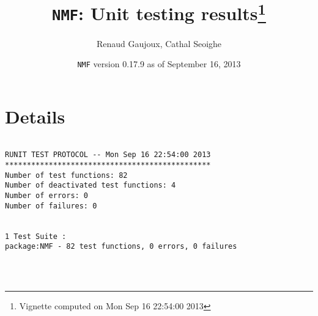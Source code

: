\documentclass[10pt]{article}\usepackage[]{graphicx}\usepackage[]{color}
\author{Renaud Gaujoux, Cathal Seoighe}
\title{\texttt{NMF}: Unit testing results\footnote{Vignette computed  on Mon Sep 16 22:54:00 2013}}
\date{\texttt{NMF} version 0.17.9 as of September 16, 2013}
\begin{document}
\maketitle

\section{Details}
\begin{verbatim}

RUNIT TEST PROTOCOL -- Mon Sep 16 22:54:00 2013 
*********************************************** 
Number of test functions: 82 
Number of deactivated test functions: 4 
Number of errors: 0 
Number of failures: 0 

 
1 Test Suite : 
package:NMF - 82 test functions, 0 errors, 0 failures




\end{verbatim}
\end{document}
